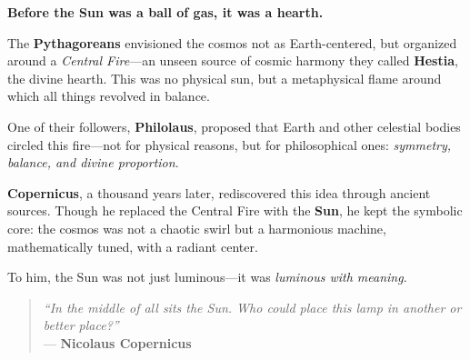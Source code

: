 \begin{tcolorbox}[title=The Sun as a Divine Center, colback=gray!5, colframe=black, fonttitle=\bfseries]

  \textbf{Before the Sun was a ball of gas, it was a hearth.}
  
  The \textbf{Pythagoreans} envisioned the cosmos not as Earth-centered, but organized around a \textit{Central Fire}—an unseen source of cosmic harmony they called \textbf{Hestia}, the divine hearth. This was no physical sun, but a metaphysical flame around which all things revolved in balance.
  
  One of their followers, \textbf{Philolaus}, proposed that Earth and other celestial bodies circled this fire—not for physical reasons, but for philosophical ones: \textit{symmetry, balance, and divine proportion}.
  
  \textbf{Copernicus}, a thousand years later, rediscovered this idea through ancient sources. Though he replaced the Central Fire with the \textbf{Sun}, he kept the symbolic core: the cosmos was not a chaotic swirl but a harmonious machine, mathematically tuned, with a radiant center.
  
  To him, the Sun was not just luminous—it was \textit{luminous with meaning}.
  
  \begin{quote}
  \textit{“In the middle of all sits the Sun. Who could place this lamp in another or better place?”} \\
  — \textbf{Nicolaus Copernicus}
  \end{quote}
  
\end{tcolorbox}


